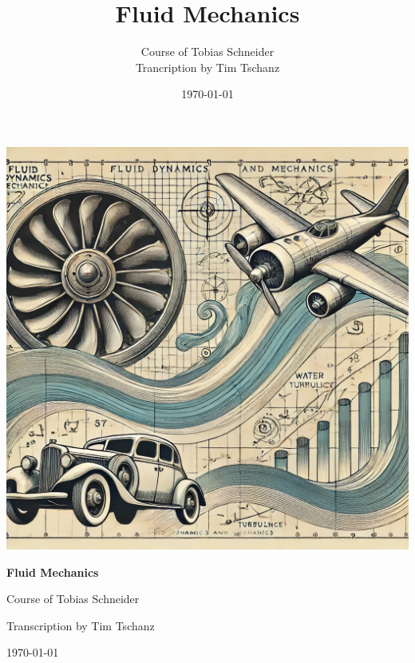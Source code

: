 \documentclass[a4paper,11pt]{book}
\title{Fluid Mechanics}
\author{Course of Tobias Schneider\\Trancription by Tim Tschanz}
\date{\today}
\begin{document}
\begin{titlepage}
    \centering
    \includegraphics[width=\textwidth]{Cover_Image.png}
    {\huge\bfseries Fluid Mechanics\par}
    {
        \vspace{1cm}
        {\large Course of Tobias Schneider\par}
        {\large Transcription by Tim Tschanz\par}
        \vspace{1cm}
    }
    {\large \today\par}
\end{titlepage}

\tableofcontents



\end{document}
